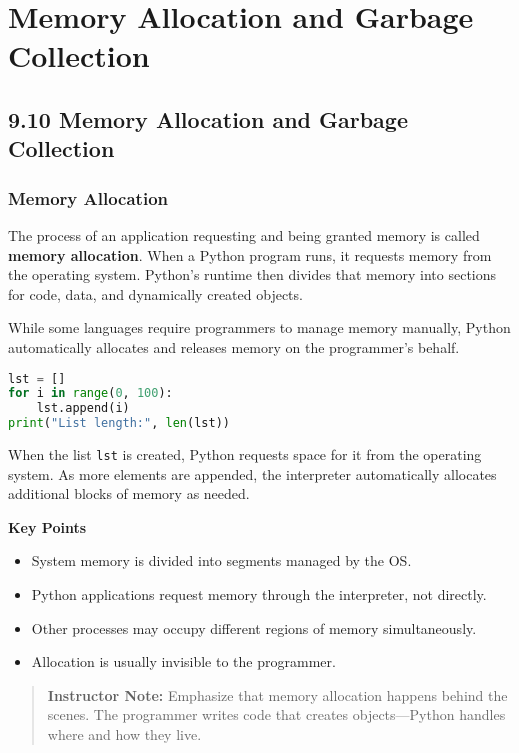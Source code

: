 \chapter{Memory Allocation and Garbage Collection}
\label{ch:memory_allocation_and_garbage_collection}

\section*{9.10 Memory Allocation and Garbage Collection}

\subsection*{Memory Allocation}

The process of an application requesting and being granted memory is called
\textbf{memory allocation}.  
When a Python program runs, it requests memory from the operating system.
Python’s runtime then divides that memory into sections for code, data, and dynamically
created objects.

While some languages require programmers to manage memory manually,
Python automatically allocates and releases memory on the programmer’s behalf.

\begin{lstlisting}[language=Python, caption={Memory allocation in Python}]
lst = []
for i in range(0, 100):
    lst.append(i)
print("List length:", len(lst))
\end{lstlisting}

When the list \texttt{lst} is created, Python requests space for it from the operating
system. As more elements are appended, the interpreter automatically allocates additional
blocks of memory as needed.

\textbf{Key Points}
\begin{itemize}
  \item System memory is divided into segments managed by the OS.
  \item Python applications request memory through the interpreter, not directly.
  \item Other processes may occupy different regions of memory simultaneously.
  \item Allocation is usually invisible to the programmer.
\end{itemize}

\begin{quote}
\textbf{Instructor Note:} Emphasize that memory allocation happens behind the scenes.
The programmer writes code that creates objects—Python handles where and how they live.
\end{quote}

